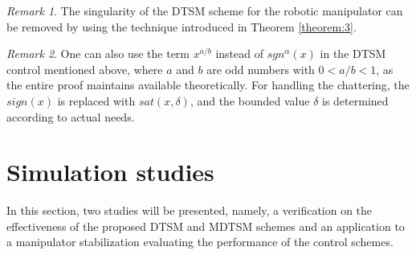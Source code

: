 \documentclass[3p]{elsarticle}
\theoremstyle{plain}
\theoremstyle{remark}
\newtheorem{myrem}{Remark}
\begin{document}
\begin{myrem}
The singularity of the DTSM scheme for the robotic manipulator can be removed by using the technique introduced in Theorem \ref{theorem:3}.
\end{myrem}
\begin{myrem}
One can also use the term $x^{a/b}$ instead of $sgn^\alpha(x)$ in the DTSM control mentioned above, where $a$ and $b$ are odd numbers with $0<a/b<1$, as the entire proof maintains available theoretically. For handling the chattering, the $sign(x)$ is replaced with $sat(x,\delta)$, and the bounded value $\delta$ is determined according to actual needs.
\end{myrem}
\section{Simulation studies}\label{sec:4}
In this section, two studies will be presented, namely, a verification on the effectiveness of the proposed DTSM and MDTSM schemes and an application to a manipulator stabilization evaluating the performance of the control schemes.
\end{document}
